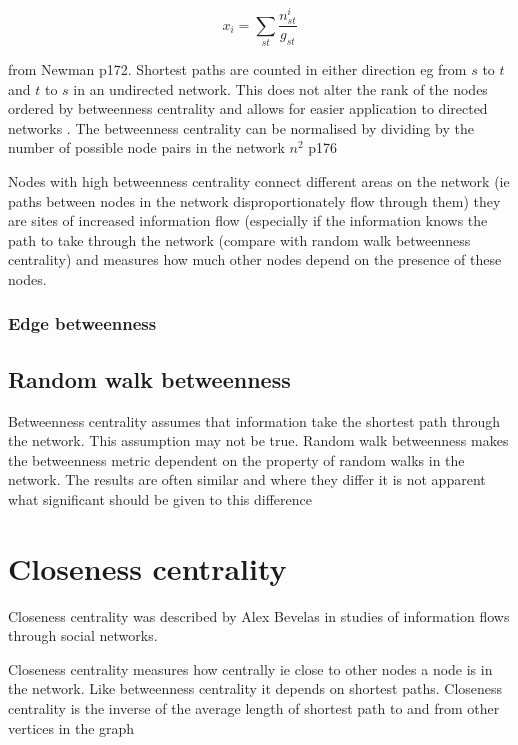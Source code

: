 \begin{equation}
    x_i = \sum_{st} \frac{n_{st}^i}{g_{st}}
\end{equation}
\label{eq: Betweenness centrality}

from Newman \cite{newman2018networks} p172. Shortest paths are counted in either direction eg from $s$ to $t$ and $t$ to $s$ in an undirected network. This does not alter the rank of the nodes ordered by betweenness centrality and allows for easier application to directed networks \cite{newman2018networks}. The betweenness centrality can be normalised by dividing by the number of possible node pairs in the network $n^2$ \cite{newman2018networks} p176

Nodes with high betweenness centrality connect different areas on the network  (ie paths between nodes in the network disproportionately flow through them) they are sites of increased information flow (especially if the information knows the path to take through the network (compare with random walk betweenness centrality) and measures how much other nodes depend on the presence of these nodes.



\subsubsection{Edge betweenness}

\subsection{Random walk betweenness}
\label{sec: random walk betweenness}
Betweenness centrality assumes that information take the shortest path through the network. This assumption may not be true. Random walk betweenness makes the betweenness metric dependent on the property of random walks in the network. The results are often similar and where they differ it is not apparent what significant should be given to this difference \cite{newman2018networks}

\section{Closeness centrality}
\label{sec:closenesscentrality}
Closeness centrality was described by Alex Bevelas in studies of information flows through social networks. 

Closeness centrality measures how centrally ie close to other nodes a node is in the network. Like betweenness centrality it depends on shortest paths. Closeness centrality is the inverse of the  average length of shortest path to and from other vertices in the graph \cite{freeman1978centrality}

